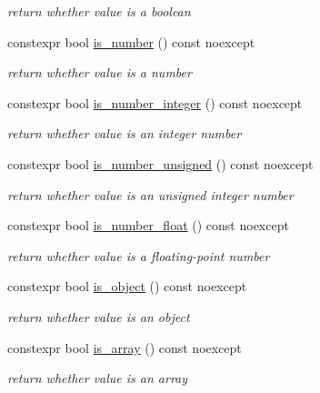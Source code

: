 \begin{DoxyCompactItemize}
\begin{DoxyCompactList}\small\item\em return whether value is a boolean \end{DoxyCompactList}\item 
constexpr bool \hyperlink{classnlohmann_1_1basic__json_a2b9852390abb4b1ef5fac6984e2fc0f3}{is\+\_\+number} () const noexcept
\begin{DoxyCompactList}\small\item\em return whether value is a number \end{DoxyCompactList}\item 
constexpr bool \hyperlink{classnlohmann_1_1basic__json_abac8af76067f1e8fdca9052882c74428}{is\+\_\+number\+\_\+integer} () const noexcept
\begin{DoxyCompactList}\small\item\em return whether value is an integer number \end{DoxyCompactList}\item 
constexpr bool \hyperlink{classnlohmann_1_1basic__json_abc7378cba0613a78b9aad1c8e7044bb0}{is\+\_\+number\+\_\+unsigned} () const noexcept
\begin{DoxyCompactList}\small\item\em return whether value is an unsigned integer number \end{DoxyCompactList}\item 
constexpr bool \hyperlink{classnlohmann_1_1basic__json_a33b4bf898b857c962e798fc7f6e86e70}{is\+\_\+number\+\_\+float} () const noexcept
\begin{DoxyCompactList}\small\item\em return whether value is a floating-\/point number \end{DoxyCompactList}\item 
constexpr bool \hyperlink{classnlohmann_1_1basic__json_af8f511af124e82e4579f444b4175787c}{is\+\_\+object} () const noexcept
\begin{DoxyCompactList}\small\item\em return whether value is an object \end{DoxyCompactList}\item 
constexpr bool \hyperlink{classnlohmann_1_1basic__json_aef9ce5dd2381caee1f8ddcdb5bdd9c65}{is\+\_\+array} () const noexcept
\begin{DoxyCompactList}\small\item\em return whether value is an array \end{DoxyCompactList}\item 

\end{DoxyCompactItemize}
